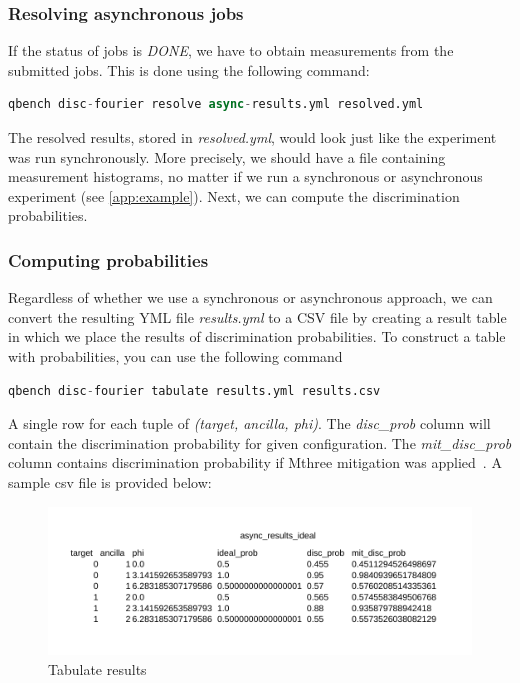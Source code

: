 \documentclass[preprint,12pt, a4paper, dvipsnames]{elsarticle}
\newcommand{\1}{{\rm 1\hspace{-0.9mm}l}}
\theoremstyle{definition}
\begin{document}
\subsubsection{Resolving asynchronous jobs}
If the status of jobs is \textit{DONE}, we have to obtain measurements from the submitted jobs. This is done using the following command:
\begin{lstlisting}[language=Python]
qbench disc-fourier resolve async-results.yml resolved.yml
\end{lstlisting}
The resolved results, stored in \textit{resolved.yml}, would look just like the experiment was run synchronously. More precisely, we should have a file containing measurement histograms, no matter if we run a synchronous or asynchronous experiment (see \ref{app:example}). Next, we can compute the discrimination probabilities.


\subsubsection{Computing probabilities}
Regardless of whether we use a synchronous or asynchronous approach, we can convert the resulting YML file \textit{results.yml} to a CSV file by creating a result table in which we place the results of discrimination probabilities.
To construct a table with probabilities, you can use the following command
\begin{lstlisting}[language=Python]
qbench disc-fourier tabulate results.yml results.csv
\end{lstlisting}
A single row for each tuple of \textit{(target, ancilla, phi)}. The \textit{disc\_prob} column will contain the discrimination probability for given configuration. The \textit{mit\_disc\_prob} column contains discrimination probability if Mthree mitigation was applied~\cite{mthree, mthreepublication}.
A sample csv file is provided below:
\begin{figure}[h!]
	\centering
	\includegraphics[scale=1]{results/async_result}
	\caption{Tabulate results}
	\label{fig:tabulateresults}
\end{figure}
\end{document}
